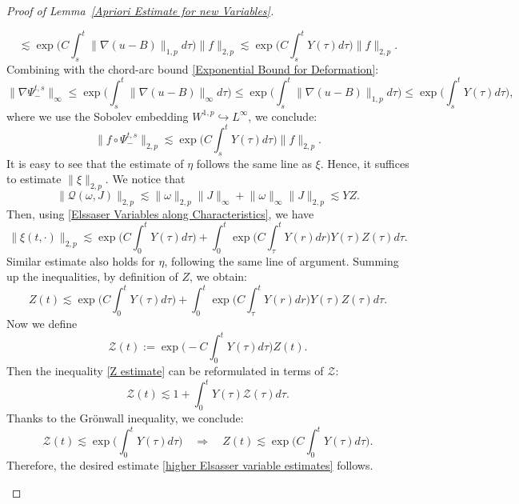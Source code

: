 \documentclass[12pt,letterpaper]{article}
\theoremstyle{plain}
\begin{document}
\begin{proof}[Proof of Lemma~\ref{Apriori Estimate for new Variables}]
\begin{itemize}
\begin{equation*}
\end{equation*}
\begin{equation*}
 \lesssim  \exp\bigg(C\int_s^t \lVert\nabla(u-B)\rVert_{1,p}d\tau\bigg) \lVert f\rVert_{2,p} \lesssim \exp\bigg(C\int_s^t Y(\tau)d\tau\bigg)\lVert f\rVert_{2,p}.
\end{equation*}
Combining with the chord-arc bound \eqref{Exponential Bound for Deformation}:
\begin{equation*}
\lVert\nabla\Psi_-^{t,s}\rVert_\infty\le \exp\bigg(\int_s^t \lVert \nabla(u-B)\rVert_\infty d\tau\bigg)\le  \exp\bigg(\int_s^t \lVert \nabla(u-B)\rVert_{1,p}d\tau\bigg)\le \exp\bigg(\int_s^t Y(\tau)d\tau\bigg),   
\end{equation*}
where we use the Sobolev embedding $W^{1,p}\hookrightarrow L^\infty$, we conclude:
\begin{equation}
 \lVert f\circ \Psi_-^{t,s} \rVert_{2,p}\lesssim   \exp\bigg(C\int_s^t Y(\tau)d\tau\bigg)\lVert f\rVert_{2,p}.
\end{equation}
It is easy to see that the estimate of $\eta$ follows the same line as $\xi$. Hence, it suffices to estimate $\lVert\xi\rVert_{2,p}$. We notice that
   \begin{equation*}
  \lVert\mathscr Q(\omega,J)\rVert_{2,p}\lesssim \lVert\omega\rVert_{2,p}\lVert J\rVert_\infty+\lVert\omega\rVert_\infty\lVert J\rVert_{2,p}\lesssim YZ.   
   \end{equation*}  
Then, using \eqref{Elssaser Variables along Characteristics}, we have
\begin{equation*}
 \lVert \xi(t,\cdot)\rVert_{2,p}\lesssim \exp\bigg(C\int_0^t Y(\tau)d\tau\bigg)+\int_0^t \exp\bigg(C\int_\tau^t Y(r)dr\bigg)Y(\tau)Z(\tau)d\tau.
\end{equation*}
Similar estimate also holds for $\eta$, following the same line of argument. Summing up the inequalities, by definition of $Z$, we obtain:
\begin{equation}\label{Z estimate}
 Z(t)\lesssim   \exp\bigg(C\int_0^t Y(\tau)d\tau\bigg)+\int_0^t \exp\bigg(C\int_\tau^t Y(r)dr\bigg)Y(\tau)Z(\tau)d\tau.
\end{equation}
Now we define 
\begin{equation*}
\mathcal Z(t):=\exp\bigg(-C\int_0^t Y(\tau)d\tau\bigg)Z(t).
\end{equation*}
Then the inequality \eqref{Z estimate} can be reformulated in terms of $\mathcal Z$:
\begin{equation*}
 \mathcal Z(t)\lesssim 1+\int_0^t Y(\tau)\mathcal Z(\tau)d\tau.  
\end{equation*}
Thanks to the Gr\"onwall inequality, we conclude:
\begin{equation*}
  \mathcal Z(t)\lesssim \exp\bigg(\int_0^t Y(\tau)d\tau\bigg)\quad\Longrightarrow\quad Z(t)\lesssim \exp\bigg(C\int_0^t Y(\tau)d\tau\bigg).  
\end{equation*}
Therefore, the desired estimate \eqref{higher Elsasser variable estimates} follows.
    \end{itemize}
\end{proof}
\end{document}
